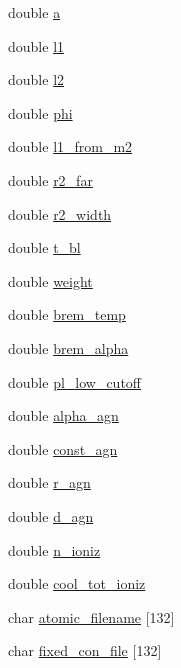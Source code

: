 \begin{DoxyCompactItemize}
double \hyperlink{structgeometry_aaf5703318225593b46f69b920d3637e7}{a}
\item 
double \hyperlink{structgeometry_a2cd7512df6007465f1cde5f43c8e0046}{l1}
\item 
double \hyperlink{structgeometry_a035ef7689d6002d513ed566a916359e2}{l2}
\item 
double \hyperlink{structgeometry_a7e45dbb08be20ce886cf47b04efd9a5f}{phi}
\item 
double \hyperlink{structgeometry_a793323d09b89fa535b821aee15494ca7}{l1\+\_\+from\+\_\+m2}
\item 
double \hyperlink{structgeometry_ada763dad8c3dca01e2e3cce4a110edb3}{r2\+\_\+far}
\item 
double \hyperlink{structgeometry_aa7a96429e84925ee52947efe9d8001ff}{r2\+\_\+width}
\item 
double \hyperlink{structgeometry_a1f8e0859717e5e41ed53be2e222b9e2b}{t\+\_\+bl}
\item 
double \hyperlink{structgeometry_a596bf1a85fcdd4da0e5308e59eda2a9a}{weight}
\item 
double \hyperlink{structgeometry_a0bb19361a7cb6ed6c4e623f73cdb8808}{brem\+\_\+temp}
\item 
double \hyperlink{structgeometry_a6901e7b9c417ec287885d4affc9e9c0f}{brem\+\_\+alpha}
\item 
double \hyperlink{structgeometry_a1b4000013a0814d5447eb7a3255a1fc5}{pl\+\_\+low\+\_\+cutoff}
\item 
double \hyperlink{structgeometry_a9a16f5c129fc954fd15b38e3cab8e12d}{alpha\+\_\+agn}
\item 
double \hyperlink{structgeometry_a944d56aa7928d99d6e86d355e90e4c3e}{const\+\_\+agn}
\item 
double \hyperlink{structgeometry_a042635649c58a769648e703a1d0c66fa}{r\+\_\+agn}
\item 
double \hyperlink{structgeometry_a5ec73dc859dc34e269b1ade3bff4e81d}{d\+\_\+agn}
\item 
double \hyperlink{structgeometry_abe1f88e34b47518ef744a2345c518f5a}{n\+\_\+ioniz}
\item 
double \hyperlink{structgeometry_a2691579d747650ade154f06e3db69198}{cool\+\_\+tot\+\_\+ioniz}
\item 
char \hyperlink{structgeometry_a6326be36064b6d068e89fc266ddf0f8f}{atomic\+\_\+filename} \mbox{[}132\mbox{]}
\item 
char \hyperlink{structgeometry_a8deac7ae205e9b683dd457b1ebfb5983}{fixed\+\_\+con\+\_\+file} \mbox{[}132\mbox{]}
\item 

\end{DoxyCompactItemize}
